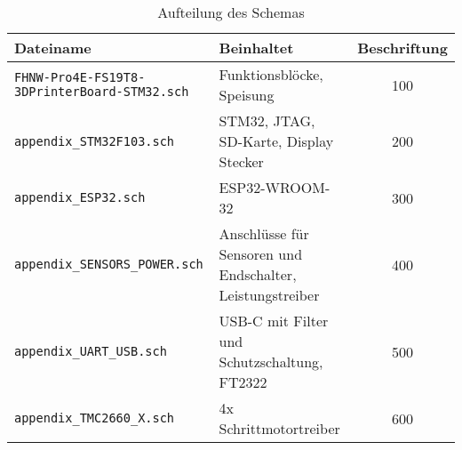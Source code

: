 \begin{table}[H]
	\centering
	\def\arraystretch{1.1} 
	\begin{tabular}{|L{6cm}|L{5cm}|c|}
		\hline
		\textbf{Dateiname}              & \textbf{Beinhaltet} & \textbf{Beschriftung} \\ \hline
		\texttt{FHNW-Pro4E-FS19T8- 3DPrinterBoard-STM32.sch} & Funktionsblöcke, Speisung & 100 \\ \hline
		\texttt{appendix\_STM32F103.sch} & STM32, JTAG, SD-Karte, Display Stecker & 200 \\ \hline
		\texttt{appendix\_ESP32.sch}     & ESP32-WROOM-32 & 300 \\ \hline
		\texttt{appendix\_SENSORS\_POWER.sch} & Anschlüsse für Sensoren und Endschalter, Leistungstreiber & 400 \\ \hline
		\texttt{appendix\_UART\_USB.sch}  & USB-C mit Filter und Schutzschaltung, FT2322 & 500 \\ \hline
		\texttt{appendix\_TMC2660\_X.sch} & 4x Schrittmotortreiber & 600 \\ \hline
		
	\end{tabular}
	\caption{Aufteilung des Schemas}
	\label{tab:Schemaaufteilung}
\end{table}
